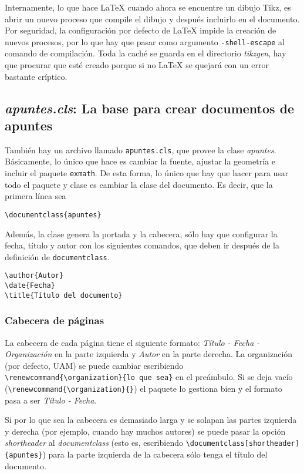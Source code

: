 Internamente, lo que hace LaTeX cuando ahora se encuentre un dibujo Tikz, es abrir un nuevo proceso que compile el dibujo y después incluirlo en el documento. Por seguridad, la configuración por defecto de LaTeX impide la creación de nuevos procesos, por lo que hay que pasar como argumento \texttt{-shell-escape} al comando de compilación. Toda la caché se guarda en el directorio \textit{tikzgen}, hay que procurar que esté creado porque si no LaTeX se quejará con un error bastante críptico.

\subsection{\textit{apuntes.cls}: La base para crear documentos de apuntes}
\label{sec:ApuntesCls}

También hay un archivo llamado \texttt{apuntes.cls}, que provee la clase \textit{apuntes}. Básicamente, lo único que hace es cambiar la fuente, ajustar la geometría e incluir el paquete \texttt{exmath}. De esta forma, lo único que hay que hacer para usar todo el paquete y clase es cambiar la clase del documento. Es decir, que la primera línea sea

\begin{verbatim}
\documentclass{apuntes}
\end{verbatim}

Además, la clase genera la portada y la cabecera, sólo hay que configurar la fecha, título y autor con los siguientes comandos, que deben ir después de la definición de \texttt{documentclass}.

\begin{verbatim}
\author{Autor}
\date{Fecha}
\title{Título del documento}
\end{verbatim}

\subsubsection{Cabecera de páginas}

La cabecera de cada página tiene el siguiente formato: \textit{Título - Fecha - Organización} en la parte izquierda y \textit{Autor} en la parte derecha. La organización (por defecto, UAM) se puede cambiar escribiendo \verb|\renewcommand{\organization}{lo que sea}| en el preámbulo. Si se deja vacío (\verb|\renewcommand{\organization}{}|) el paquete lo gestiona bien y el formato pasa a ser \textit{Título - Fecha}.

Si por lo que sea la cabecera es demasiado larga y se solapan las partes izquierda y derecha (por ejemplo, cuando hay muchos autores) se puede pasar la opción \textit{shortheader} al \textit{documentclass} (esto es, escribiendo \verb|\documentclass[shortheader]{apuntes}|) para la parte izquierda de la cabecera sólo tenga el título del documento.

